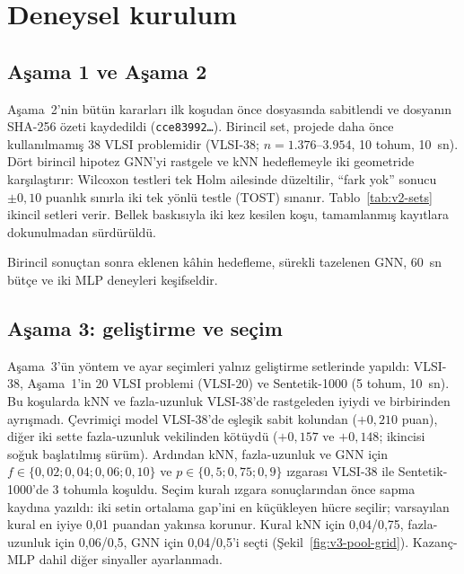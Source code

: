 \section{Deneysel kurulum}\label{sec:deney-kurulum}

\subsection{Aşama 1 ve Aşama 2}\label{sec:deney-onkayit}

Aşama~2'nin bütün kararları ilk koşudan önce  dosyasında sabitlendi ve dosyanın
SHA-256 özeti kaydedildi (\texttt{cce83992\ldots}).
Birincil set, projede daha önce kullanılmamış 38 VLSI problemidir (VLSI-38; $n=1.376$--$3.954$,
10 tohum, 10~sn).
Dört birincil hipotez GNN'yi rastgele ve kNN hedeflemeyle iki geometride karşılaştırır: Wilcoxon
testleri tek Holm ailesinde düzeltilir, ``fark yok'' sonucu $\pm0{,}10$ puanlık sınırla iki tek
yönlü testle (TOST) sınanır.
Tablo~\ref{tab:v2-sets} ikincil setleri verir. Bellek baskısıyla iki kez kesilen koşu, tamamlanmış
kayıtlara dokunulmadan sürdürüldü.



Birincil sonuçtan sonra eklenen kâhin hedefleme, sürekli tazelenen GNN, 60~sn bütçe ve iki MLP
deneyleri keşifseldir.

\subsection{Aşama 3: geliştirme ve seçim}\label{sec:deney-asama3}

Aşama~3'ün yöntem ve ayar seçimleri yalnız geliştirme setlerinde yapıldı: VLSI-38, Aşama~1'in 20
VLSI problemi (VLSI-20) ve Sentetik-1000 (5 tohum, 10~sn). Bu koşularda kNN ve fazla-uzunluk
VLSI-38'de rastgeleden iyiydi ve birbirinden ayrışmadı.
Çevrimiçi model VLSI-38'de eşleşik sabit kolundan ($+0{,}210$ puan), diğer iki sette fazla-uzunluk
vekilinden kötüydü ($+0{,}157$ ve $+0{,}148$; ikincisi soğuk başlatılmış sürüm).
Ardından kNN, fazla-uzunluk ve GNN için $f\in\{0{,}02;0{,}04;0{,}06;0{,}10\}$ ve
$p\in\{0{,}5;0{,}75;0{,}9\}$ ızgarası VLSI-38 ile Sentetik-1000'de 3 tohumla koşuldu. Seçim kuralı
ızgara sonuçlarından önce sapma kaydına yazıldı: iki setin ortalama gap'ini en küçükleyen hücre
seçilir; varsayılan kural en iyiye 0,01 puandan yakınsa korunur. Kural kNN için 0,04/0,75,
fazla-uzunluk için 0,06/0,5, GNN için 0,04/0,5'i seçti (Şekil~\ref{fig:v3-pool-grid}).
Kazanç-MLP dahil diğer sinyaller ayarlanmadı.

